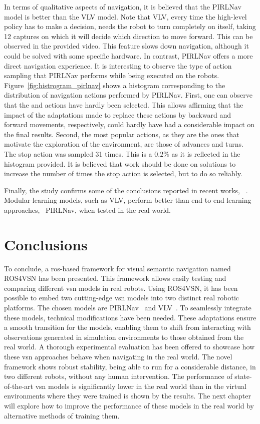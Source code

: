 In terms of qualitative aspects of navigation, it is believed that the PIRLNav model is better than the VLV model.
Note that VLV, every time the high-level policy has to make a decision, needs the robot to turn completely on itself, taking 12 captures on which it will decide which direction to move forward.
This can be observed in the provided video.
This feature slows down navigation, although it could be solved with some specific hardware.
In contrast, PIRLNav offers a more direct navigation experience.
It is interesting to observe the type of action sampling that PIRLNav performs while being executed on the robots.
Figure~\ref{fig:histrogram_pirlnav} shows a histogram corresponding to the distribution of navigation actions performed by PIRLNav.
First, one can observe that the \lookup and \lookdown actions have hardly been selected.
This allows affirming that the impact of the adaptations made to replace these actions by backward and forward movements, respectively, could hardly have had a considerable impact on the final results.
Second, the most popular actions, as they are the ones that motivate the exploration of the environment, are those of advances and turns.
The stop action was sampled 31 times.
This is a $0.2\%$ as it is reflected in the histogram provided.
It is believed that work should be done on solutions to increase the number of times the stop action is selected, but to do so reliably.

Finally, the study confirms some of the conclusions reported in recent works, \eg~\cite{gervet2022}.
Modular-learning models, such as VLV, perform better than end-to-end learning approaches, \eg~PIRLNav, when tested in the real world.

\section{Conclusions}\label{sec:conclusions_ros4vsn}
To conclude, a \acrshort{ros}-based framework for visual semantic navigation named ROS4VSN has been presented.
This framework allows easily testing and comparing different \acrshort{vsn} models in real robots.
Using ROS4VSN, it has been possible to embed two cutting-edge \acrshort{vsn} models into two distinct real robotic platforms.
The chosen models are PIRLNav~\cite{ramrakhya2023} and VLV~\cite{chang2020}.
To seamlessly integrate these models, technical modifications have been needed.
These adaptations ensure a smooth transition for the models, enabling them to shift from interacting with observations generated in simulation environments to those obtained from the real world.
A thorough experimental evaluation has been offered to showcase how these \acrshort{vsn} approaches behave when navigating in the real world.
The novel framework shows robust stability, being able to run for a considerable distance, in two different robots, without any human intervention.
The performance of state-of-the-art \acrshort{vsn} models is significantly lower in the real world than in the virtual environments where they were trained is shown by the results.
The next chapter will explore how to improve the performance of these models in the real world by alternative methods of training them.
